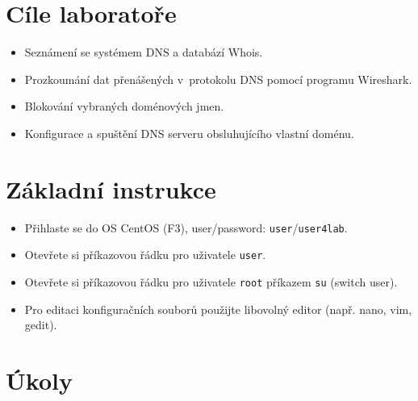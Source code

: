 
\section*{Cíle laboratoře}
\begin{itemize}
  \item Seznámení se systémem DNS a databází Whois.
  \item Prozkoumání dat přenášených v~protokolu DNS pomocí programu Wireshark.
  \item Blokování vybraných doménových jmen.
  \item Konfigurace a spuštění DNS serveru obsluhujícího vlastní doménu.
\end{itemize}

\section*{Základní instrukce}
\begin{itemize}
  \item Přihlaste se do OS CentOS (F3), user/password: {\tt user}/{\tt user4lab}.
  \item Otevřete si příkazovou řádku pro uživatele {\tt user}.
  \item Otevřete si příkazovou řádku pro uživatele {\tt root} příkazem {\tt su}
    (switch user).
  \item Pro editaci konfiguračních souborů použijte libovolný editor (např.
    nano, vim, gedit).
\end{itemize}

\section*{Úkoly}

